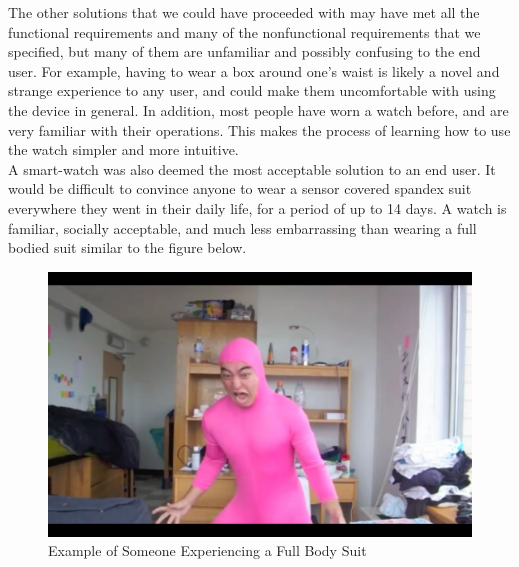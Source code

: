 \documentclass[12pt, titlepage]{article}
\begin{document}
\begin{enumerate}
The other solutions that we could have proceeded with may have met all the functional requirements and many of the nonfunctional requirements that we specified, but many of them are unfamiliar and possibly confusing to the end user. For example, having to wear a box around one's waist is likely a novel and strange experience to any user, and could make them uncomfortable with using the device in general. In addition, most people have worn a watch before, and are very familiar with their operations. This makes the process of learning how to use the watch simpler and more intuitive.\\

A smart-watch was also deemed the most acceptable solution to an end user. It would be difficult to convince anyone to wear a sensor covered spandex suit everywhere they went in their daily life, for a period of up to 14 days. A watch is familiar, socially acceptable, and much less embarrassing than wearing a full bodied suit similar to the figure below.

\end{enumerate}

\begin{figure}[H]
	\begin{center}
		 \includegraphics[width=1\textwidth]{Pink}
		\caption{Example of Someone Experiencing a Full Body Suit}
		\label{Pink} 
	\end{center}
\end{figure}
\end{document}
